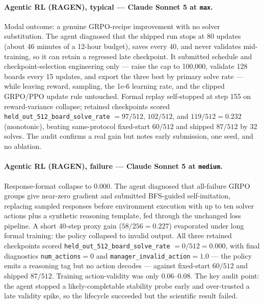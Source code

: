 \paragraph{Agentic RL (RAGEN), typical --- Claude Sonnet 5 at \texttt{max}.} Modal outcome: a genuine GRPO-recipe improvement with no solver substitution. The agent diagnosed that the shipped run stops at 80 updates (about 46 minutes of a 12-hour budget), saves every 40, and never validates mid-training, so it can retain a regressed late checkpoint. It submitted schedule and checkpoint-selection engineering only --- raise the cap to 100{,}000, validate 128 boards every 15 updates, and export the three best by primary solve rate --- while leaving reward, sampling, the 1e-6 learning rate, and the clipped GRPO/PPO update rule untouched. Formal replay self-stopped at step 155 on reward-variance collapse; retained checkpoints scored \texttt{held\_out\_512\_board\_solve\_rate} $=97/512$, $102/512$, and $119/512=0.232$ (monotonic), beating same-protocol fixed-start $60/512$ and shipped $87/512$ by 32 solves. The audit confirms a real gain but notes early submission, one seed, and no ablation.

\paragraph{Agentic RL (RAGEN), failure --- Claude Sonnet 5 at \texttt{medium}.} Response-format collapse to $0.000$. The agent diagnosed that all-failure GRPO groups give near-zero gradient and submitted BFS-guided self-imitation, replacing sampled responses before environment execution with up to ten solver actions plus a synthetic reasoning template, fed through the unchanged loss pipeline. A short 40-step proxy gain ($58/256=0.227$) evaporated under long formal training: the policy collapsed to invalid output. All three retained checkpoints scored \texttt{held\_out\_512\_board\_solve\_rate} $=0/512=0.000$, with final diagnostics \texttt{num\_actions}$=0$ and \texttt{manager\_invalid\_action}$=1.0$ --- the policy emits a reasoning tag but no action decodes --- against fixed-start $60/512$ and shipped $87/512$. Training action-validity was only 0.06--0.08. The key audit point: the agent stopped a likely-completable stability probe early and over-trusted a late validity spike, so the lifecycle succeeded but the scientific result failed.

